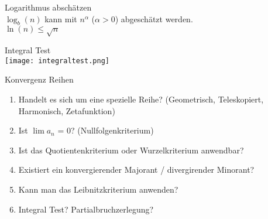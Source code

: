 \begin{KR}{Logarithmus abschätzen}\\
    $\log_b (n)$ kann mit $n^\alpha$ ($\alpha > 0$) abgeschätzt werden.\\
    $\ln(n) \leq \sqrt{n}$
\end{KR}

\begin{KR}{Integral Test}\\
    \texttt{[image: integraltest.png]}
\end{KR}

\begin{KR}{Konvergenz Reihen}
    \begin{enumerate}
        \item Handelt es sich um eine spezielle Reihe? (Geometrisch, Teleskopiert, Harmonisch, Zetafunktion)
        \item Ist $\lim a_n$ = 0? (Nullfolgenkriterium)
        \item Ist das Quotientenkriterium oder Wurzelkriterium anwendbar?
        \item Existiert ein konvergierender Majorant / divergirender Minorant?
        \item Kann man das Leibnitzkriterium anwenden?
        \item Integral Test? Partialbruchzerlegung?
    \end{enumerate}
\end{KR}

\begin{center}
\end{center}

